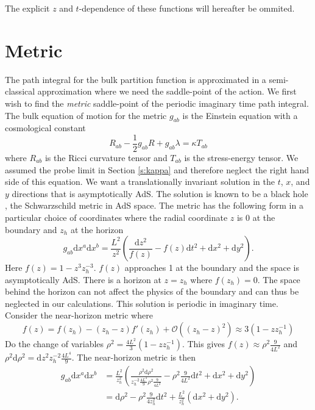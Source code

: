 \documentclass[12pt]{report}
\renewcommand{\d}{\ensuremath{\mathrm{d}}}
\begin{document}
The explicit $z$ and $t$-dependence of these functions will hereafter be ommited. 
\section{Metric\label{s:metric}}
The path integral for the bulk partition function is approximated in a semi-classical approximation where we need the saddle-point of the action. We first wish to find the \emph{metric} saddle-point of the periodic imaginary time path integral. The bulk equation of motion for the metric $g_{ab}$ is the Einstein equation with a cosmological constant
\begin{equation}
R_{ab}-\frac{1}{2}g_{ab}R+g_{ab}\lambda=\kappa T_{ab}\label{einstein}
\end{equation}
where $R_{ab}$ is the Ricci curvature tensor and $T_{ab}$ is the stress-energy tensor. We assumed the probe limit in Section \ref{s:kappa} and therefore neglect the right hand side of this equation. We want a translationally invariant solution in the $t$, $x$, and $y$ directions that is asymptotically AdS. The solution is known to be a black hole \cite{McGreevy:2009xe}, the Schwarzschild metric in AdS space. The metric has the following form in a particular choice of coordinates where the radial coordinate $z$ is 0 at the boundary and $z_h$ at the horizon
\begin{equation}
 g_{ab}\d x^a\d x^b=\frac{L^2}{z^2}\left(\frac{\d z^2}{f(z)}-f(z)\d t^2+\d x^2+\d y^2\right).\label{metric}
\end{equation}
Here $f(z)=1-z^3z_h^{-3}$. $f(z)$ approaches 1 at the boundary and the space is asymptotically AdS. There is a horizon at $z=z_h$ where $f(z_h)=0$. The space behind the horizon can not affect the physics of the boundary and can thus be neglected in our calculations. This solution is periodic in imaginary time. Consider the near-horizon metric where
\begin{equation}
  f(z)=f(z_h)-(z_h-z)f'(z_h)+\mathcal{O}((z_h-z)^2)\approx 3(1-zz_h^{-1})
\end{equation}
Do the change of variables $\rho^2=\frac{4L^2}{3}(1-zz_h^{-1})$. This gives $f(z)\approx \rho^2\frac{9}{4L^2}$ and $\rho^2\d \rho^2=\d z^2 z_h^{-2}\frac{4L^4}{9}$. The near-horizon metric is then
\begin{equation}
\begin{split}
 g_{ab}\d x^a\d x^b&=\frac{L^2}{z_h^2}\left(\frac{\rho^2\d \rho^2  }{z_h^{-2}\frac{4L^4}{9}\rho^2\frac{9}{4L^2}}-\rho^2\frac{9}{4L^2}\d t^2+\d x^2+\d y^2\right)\\
&= \d \rho^2 -\rho^2\frac{9}{4z_h^2}\d t^2+\frac{L^2}{z_h^2}\left(\d x^2+\d y^2\right).
\end{split}
\end{equation}
\end{document}
